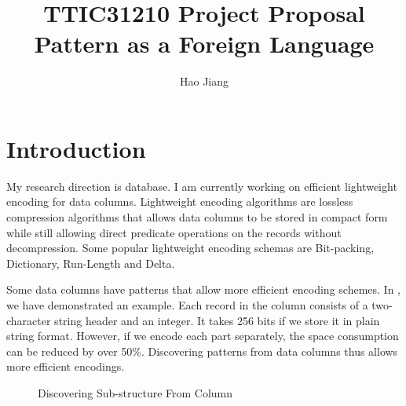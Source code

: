 \documentclass{article}
\title{TTIC31210 Project Proposal \\ 
\vspace{2mm} 
\Large{Pattern as a Foreign Language}}
\date{}
\author{Hao Jiang}
\begin{document}
\maketitle

\section{Introduction}

My research direction is database. I am currently working on
efficient lightweight encoding for data columns. Lightweight encoding algorithms
are lossless compression algorithms that allows data columns to be stored
in compact form while still allowing direct predicate operations on the
records without decompression. Some popular lightweight encoding schemas are
Bit-packing, Dictionary, Run-Length and Delta.

Some data columns have patterns that allow more efficient
encoding schemes. In , we have demonstrated an example. Each
record in the column consists of a two-character string header and an integer.
It takes 256 bits if we store it in plain string format. However, if we
encode each part separately, the space consumption can be reduced by over 50\%.
Discovering patterns from data columns thus allows more efficient encodings.

\begin{figure}
\centering
{}
\caption{Discovering Sub-structure From Column}
\label{fig:example}
\end{figure}
\end{document}
